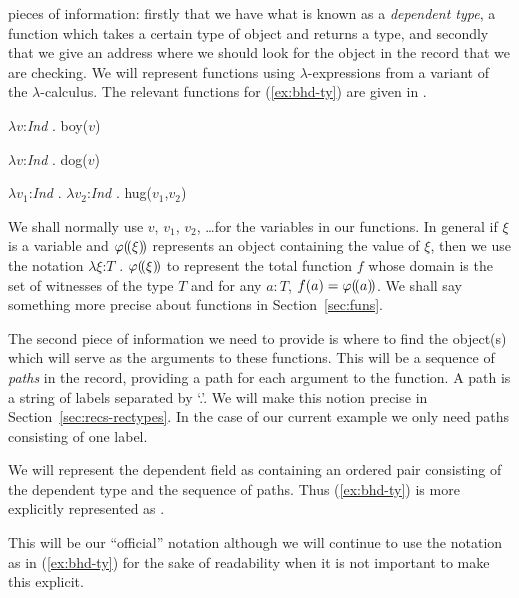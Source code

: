 pieces of information: firstly that we have what is known as a
\textit{dependent type}, a function which takes a certain type of
object and returns a type, and secondly that we give an address where we should look for the object in the record that we are
checking.  We will represent functions using $\lambda$-expressions
from a variant of the $\lambda$-calculus.  The relevant functions for
(\ref{ex:bhd-ty}) are given in \nexteg{}.
\begin{ex}
\begin{subex} 
 
\item $\lambda v$:\textit{Ind} . boy($v$) 
 
\item $\lambda v$:\textit{Ind} . dog($v$)

\item $\lambda v_1$:\textit{Ind} . $\lambda v_2$:\textit{Ind} . hug($v_1$,$v_2$) 
 
\end{subex} 
   
 
\end{ex} 
We shall normally use $v$, $v_1$, $v_2$, \ldots for the variables in
our functions.  In general if $\xi$ is a variable and
$\varphi(\!(\xi)\!)$ represents an object containing the value of $\xi$, then we
use the notation $\lambda\xi$:$T$ . $\varphi(\!(\xi)\!)$ to
represent the total function $f$ whose domain is the set of witnesses
of the type $T$ and for any $a:T$, $f(a)=\varphi(\!(a)\!)$.  We shall
say something more precise about functions in Section~\ref{sec:funs}.

The second piece of information we need to provide is where to find
the object(s) which will serve as the arguments to these functions.
This will be a sequence of \textit{paths} in the record, providing a
path for each argument to the function.  A path is a string of labels
separated by `.'.  We will make this notion precise in
Section~\ref{sec:recs-rectypes}.  In the case of our current example
we only need paths consisting of one label.

We will represent the dependent field as containing an ordered pair
consisting of the dependent type and the sequence of paths.  Thus
(\ref{ex:bhd-ty}) is more explicitly represented as \nexteg{}.
\begin{ex} 
\end{ex} 
This will
be our ``official'' notation although we will continue to use the
notation as in (\ref{ex:bhd-ty}) for the sake of readability when it
is not important to make this explicit.

